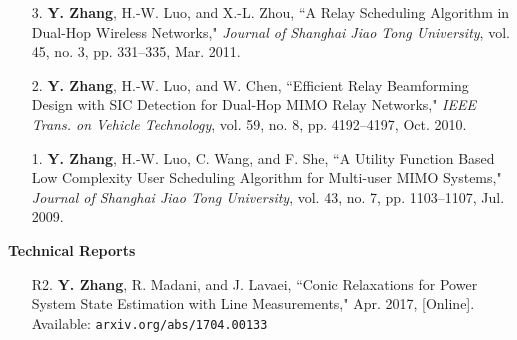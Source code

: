 \documentclass[margin,line]{res}
\begin{document}
\begin{resume}
\begin{enumerate}
\item[3.]	\textbf{Y. Zhang}, H.-W. Luo, and X.-L. Zhou,
``A Relay Scheduling Algorithm in Dual-Hop Wireless Networks,"
\emph{Journal of Shanghai Jiao Tong University}, vol. 45, no. 3, pp. 331--335, Mar. 2011.

\item[2.]	\textbf{Y. Zhang}, H.-W. Luo, and W. Chen,
``Efficient Relay Beamforming Design with SIC Detection for Dual-Hop MIMO Relay Networks,"
\emph{IEEE Trans. on Vehicle Technology}, vol. 59, no. 8, pp. 4192--4197, Oct. 2010.

\item[1.]	\textbf{Y. Zhang}, H.-W. Luo, C. Wang, and F. She,
``A Utility Function Based Low Complexity User Scheduling Algorithm for Multi-user MIMO Systems,"
\emph{Journal of Shanghai Jiao Tong University}, vol. 43, no. 7, pp. 1103--1107, Jul. 2009.


\end{enumerate}




%
%
%
%
%
%
%
%
%
%
%
%


{\bf Technical Reports}

\vspace{.2cm}

\begin{enumerate}

\item[R2.]	\textbf{Y. Zhang}, R. Madani, and J. Lavaei,
``Conic Relaxations for Power System State Estimation with Line Measurements,"
 Apr. 2017, [Online]. Available: \texttt{arxiv.org/abs/1704.00133}


\end{enumerate}
\end{resume}
\end{document}
